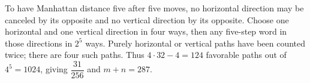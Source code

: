 To have Manhattan distance five after five moves, no horizontal direction may be canceled by its opposite and no vertical direction by its opposite. Choose one horizontal and one vertical direction in four ways, then any five-step word in those directions in $2^5$ ways. Purely horizontal or vertical paths have been counted twice; there are four such paths. Thus $4\cdot 32-4=124$ favorable paths out of $4^5=1024$, giving $\dfrac{31}{256}$ and $\boxed{m+n=287}$.
